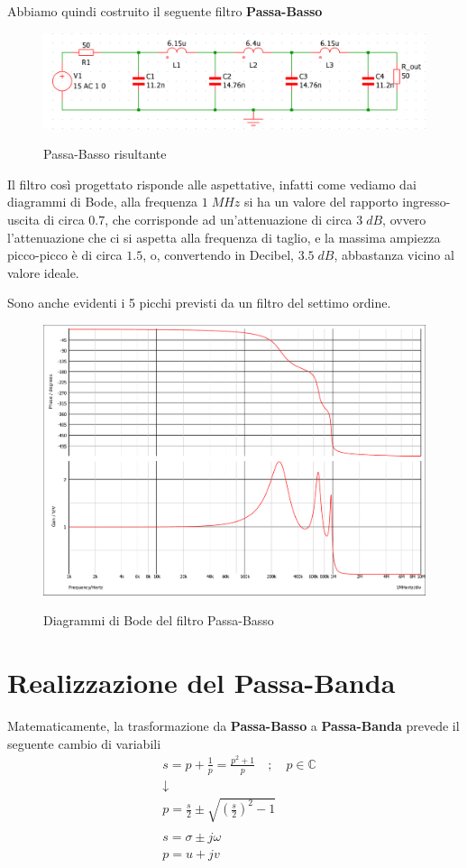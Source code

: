 \documentclass[a4paper,12pt]{report}
\newcommand{\C}{\mathbb{C}}
\newcommand{\firstpassage}{ \\ &\downarrow \nonumber \\}
\newcommand{\spacer}{\quad ; \quad}
\begin{document}
Abbiamo quindi costruito il seguente filtro \textbf{Passa-Basso}

\begin{figure}[!htb]
	\centering
	\includegraphics[width=\textwidth]{passa_basso.png}
	\label{lel}
	\caption{\label{kokw} \small Passa-Basso risultante}
\end{figure}

Il filtro così progettato risponde alle aspettative, infatti come vediamo dai diagrammi di Bode, alla frequenza $1 \; MHz$ si ha un valore del rapporto ingresso-uscita di circa $0.7$, che corrisponde ad un'attenuazione di circa $3 \; dB$, ovvero l'attenuazione che ci si aspetta alla frequenza di taglio, e la massima ampiezza picco-picco è di circa $1.5$, o, convertendo in Decibel, $3.5 \; dB$, abbastanza vicino al valore ideale.

Sono anche evidenti i 5 picchi previsti da un filtro del settimo ordine.

\begin{figure}[!htb]
	\centering
	\includegraphics[width=.7\textwidth]{bodeesame1.pdf}
	\label{lel}
	\caption{\label{kokw} \small Diagrammi di Bode del filtro Passa-Basso}
\end{figure}

\newpage

\section{Realizzazione del Passa-Banda}

Matematicamente, la trasformazione da \textbf{Passa-Basso} a \textbf{Passa-Banda} prevede il seguente cambio di variabili
\begin{align}
&s = p + \frac{1}{p} = \frac{p^2 + 1}{p} \spacer p\in \C \firstpassage
&p = \frac{s}{2} \pm \sqrt{\left(\frac{s}{2}\right)^2 - 1}\\
\nonumber\\
&s = \sigma \pm j \omega\\
&p = u + jv
\end{align}
\end{document}
